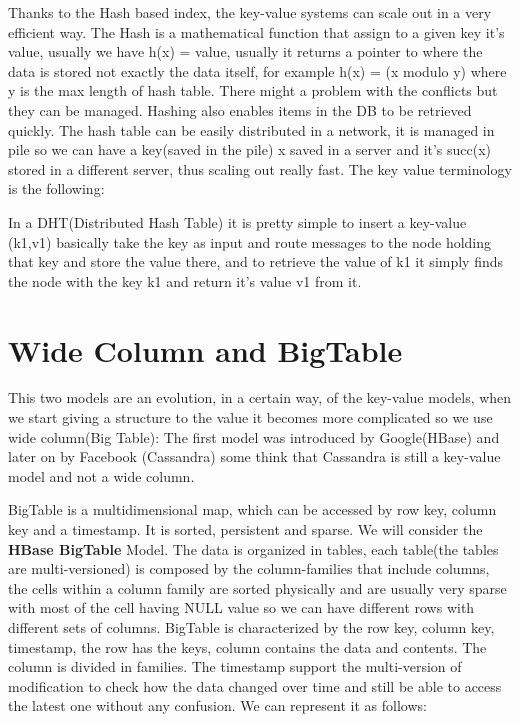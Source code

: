 \documentclass[a4page, 11pt]{article}
\begin{document}
Thanks to the Hash based index, the key-value systems can scale out in a very efficient way. 
The Hash is a mathematical function that assign to a given key it's value, usually we have h(x) = value, usually it returns a pointer to where the data is stored not exactly the data itself, for example h(x) = (x modulo y) where y is the max length of hash table. 
There might a problem with the conflicts but they can be managed. 
Hashing also enables items in the DB to be retrieved quickly. 
The hash table can be easily distributed in a network, it is managed in pile so we can have a key(saved in the pile) x saved in a server and it's succ(x) stored in a different server, thus scaling out really fast. 
The key value terminology is the following:

In a DHT(Distributed Hash Table) it is pretty simple to insert a key-value (k1,v1) basically take the key as input and route messages to the node holding that key and store the value there, and to retrieve the value of k1 it simply finds the node with the key k1 and return it's value v1 from it.

\section{Wide Column and BigTable}
This two models are an evolution, in a certain way, of the key-value models, when we start giving a structure to the value it becomes more complicated so we use wide column(Big Table): The first model was introduced by Google(HBase) and later on by Facebook (Cassandra) some think that Cassandra is still a key-value model and not a wide column.

BigTable is a multidimensional map, which can be accessed by row key, column key and a timestamp. It is sorted, persistent and sparse.
We will consider the \textbf{HBase BigTable} Model.
The data is organized in tables, each table(the tables are multi-versioned) is composed by the column-families that include columns, the cells within a column family are sorted physically and are usually very sparse with most of the cell having NULL value so we can have different rows with different sets of columns. 
BigTable is characterized by the row key, column key, timestamp, the row has the keys, column contains the data and contents. 
The column is divided in families. The timestamp support the multi-version of modification to check how the data changed over time and still be able to access the latest one without any confusion. We can represent it as follows:
\end{document}
